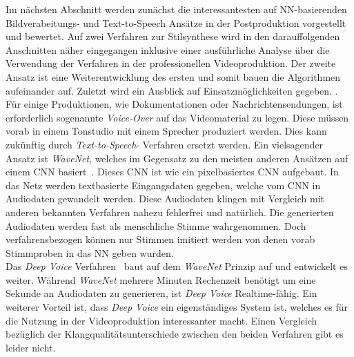 \documentclass[times, 11pt,twocolumn]{article}
\begin{document}
Im nächsten Abschnitt werden zunächst die interessantesten auf NN-basierenden Bildverabeitungs- und Text-to-Speech Ansätze in der Postproduktion vorgestellt und bewertet. Auf zwei Verfahren zur Stilsynthese wird in den darauffolgenden Anschnitten näher eingegangen inklusive einer ausführliche Analyse über die Verwendung der Verfahren in der professionellen Videoproduktion. Der zweite Ansatz ist eine Weiterentwicklung des ersten und somit bauen die Algorithmen aufeinander auf. Zuletzt wird ein Ausblick auf Einsatzmöglichkeiten gegeben.
.
 \label{sec:SOTAPostproduktion}
Für einige Produktionen, wie Dokumentationen oder Nachrichtensendungen, ist erforderlich sogenannte \textit{Voice-Over} auf das Videomaterial zu legen. Diese müssen vorab in einem Tonstudio mit einem Sprecher produziert werden. Dies kann zukünftig durch \textit{Text-to-Speech}- Verfahren ersetzt werden. Ein vielsagender Ansatz ist \textit{WaveNet}, welches im Gegensatz zu den meisten anderen Ansätzen auf einem CNN basiert~\cite{OordDZSVGKSK16}. Dieses CNN ist wie ein pixelbasiertes CNN aufgebaut. In das Netz werden textbasierte Eingangsdaten gegeben, welche vom CNN in Audiodaten gewandelt werden. Diese Audiodaten klingen mit Vergleich mit anderen bekannten Verfahren nahezu fehlerfrei und natürlich. Die generierten Audiodaten werden fast als menschliche Stimme wahrgenommen. Doch verfahrensbezogen können nur Stimmen imitiert werden von denen vorab Stimmproben in das NN geben wurden.\\
Das \textit{Deep Voice} Verfahren~\cite{DeepVoice} baut auf dem \textit{WaveNet} Prinzip auf und entwickelt es weiter. Während \textit{WaveNet} mehrere Minuten Rechenzeit benötigt um eine Sekunde an Audiodaten zu generieren, ist \textit{Deep Voice} Realtime-fähig. Ein weiterer Vorteil ist, dass \textit{Deep Voice} ein eigenständiges System ist, welches es für die Nutzung in der Videoproduktion interessanter macht. Einen Vergleich bezüglich der Klangqualitätsunterschiede zwischen den beiden Verfahren gibt es leider nicht.
\\
\end{document}
